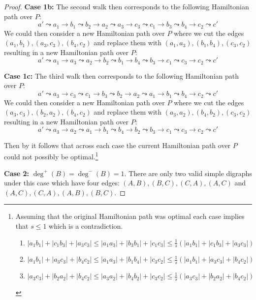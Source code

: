 \documentclass{article}
\theoremstyle{definition}
\begin{document}
\begin{proof}
    \textbf{Case 1b:} The second walk then corresponds to the following Hamiltonian path over $P$:
    $$a' \leadsto a_1 \to b_1 \leadsto b_2 \to a_2 \leadsto a_3 \to c_3 \leadsto c_1 \to b_3 \leadsto b_4 \to c_2 \leadsto c'$$
    We could then consider a new Hamiltonian path over $P$ where we cut the edges $(a_1, b_1), (a_3, c_3), (b_4, c_2)$ and replace them with $(a_1, a_3), (b_1, b_4), (c_3, c_2)$ resulting in a new Hamiltonian path over $P$:
    $$a' \leadsto a_1 \to a_3 \leadsto a_2 \to b_2 \leadsto b_1 \to b_4 \leadsto b_3 \to c_1 \leadsto c_3 \to c_2 \leadsto c'$$

    \textbf{Case 1c:} The third walk then corresponds to the following Hamiltonian path over $P$:
    $$a' \leadsto a_3 \to c_3 \leadsto c_1 \to b_3 \leadsto b_2 \to a_2 \leadsto a_1 \to b_1 \leadsto b_4 \to c_2 \leadsto c'$$
    We could then consider a new Hamiltonian path over $P$ where we cut the edges $(a_3, c_3), (b_2, a_2), (b_4, c_2)$ and replace them with $(a_3, a_2), (b_4, b_2), (c_3, c_2)$ resulting in a new Hamiltonian path over $P$:
    $$a' \leadsto a_3 \to a_2 \leadsto a_1 \to b_1 \leadsto b_4 \to b_2 \leadsto b_3 \to c_1 \leadsto c_3 \to c_2 \leadsto c'$$

    Then by  it follows that across each case the current Hamiltonian path over $P$ could not possibly be optimal.\footnote{
        Assuming that the original Hamiltonian path was optimal each case implies that $s \leq 1$ which is a contradiction.
        \begin{enumerate}
            \item $|a_1 b_1| + |c_1 b_3| + |a_3 c_3| \leq |a_1 a_3| + |b_3 b_1| + |c_1 c_3| \leq \frac{1}{s} (|a_1 b_1| + |c_1 b_3| + |a_3 c_3|)$
            \item $|a_1 b_1| + |a_3 c_3| + |b_4 c_2| \leq |a_1 a_3| + |b_1 b_4| + |c_3 c_2| \leq \frac{1}{s} (|a_1 b_1| + |a_3 c_3| + |b_4 c_2|)$
            \item $|a_3 c_3| + |b_2 a_2| + |b_4 c_2| \leq |a_3 a_2| + |b_4 b_2| + |c_3 c_2| \leq \frac{1}{s} (|a_3 c_3| + |b_2 a_2| + |b_4 c_2|)$
        \end{enumerate}
    }

    \textbf{Case 2:} $\deg^+(B) = \deg^-(B) = 1$. %
    There are only two valid simple digraphs under this case which have four edges: $(A,B), (B,C), (C,A), (A,C)$ and $(A,C), (C,A), (A,B), (B,C)$.
    

\end{proof}
\end{document}
